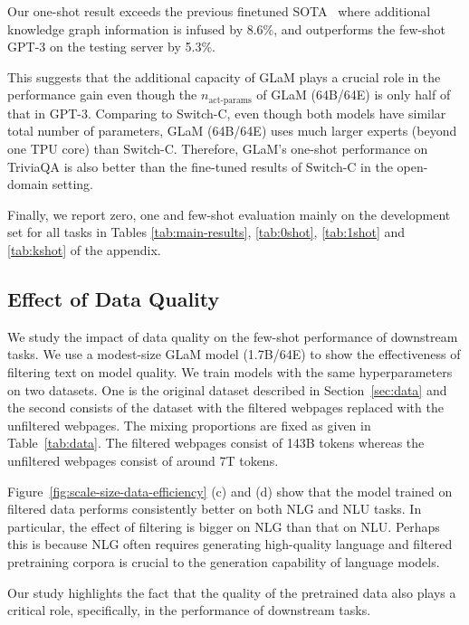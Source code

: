 Our one-shot result exceeds the previous finetuned SOTA~\cite{yu2021kgfid} where additional knowledge graph information is infused by 8.6\%, and outperforms the few-shot GPT-3 on the testing server by 5.3\%.

This suggests that the additional capacity of GLaM plays a crucial role in the performance gain even though the $n_{\text{act-params}}$ of GLaM (64B/64E) is only half of that in GPT-3. Comparing to Switch-C, even though both models have similar total number of parameters, GLaM (64B/64E) uses much larger experts (beyond one TPU core) than Switch-C. Therefore, GLaM’s one-shot performance on TriviaQA is also better than the fine-tuned results of Switch-C in the open-domain setting. 

Finally, we report zero, one and few-shot evaluation mainly on the development set for all tasks in Tables \ref{tab:main-results}, \ref{tab:0shot}, \ref{tab:1shot} and \ref{tab:kshot} of the appendix.

\subsection{Effect of Data Quality}
\label{sec:data-quality}
We study the impact of data quality on the few-shot performance of downstream tasks. We use a modest-size GLaM model (1.7B/64E) to show the effectiveness of filtering text on model quality. We train models with the same hyperparameters on two datasets. One is the original dataset described in Section~\ref{sec:data} and the second consists of the dataset with the filtered webpages replaced with the unfiltered webpages. The mixing proportions are fixed as given in Table~\ref{tab:data}. The filtered webpages consist of 143B tokens whereas the unfiltered webpages consist of around 7T tokens.

Figure~\ref{fig:scale-size-data-efficiency} (c) and (d) show that the model trained on filtered data performs consistently better on both NLG and NLU tasks. In particular, the effect of filtering is bigger on NLG than that on NLU. Perhaps this is because NLG often requires generating high-quality language and filtered pretraining corpora is crucial to the generation capability of language models.

Our study highlights the fact that the quality of the pretrained data also plays a critical role, specifically, in the performance of downstream tasks.


